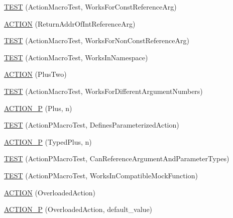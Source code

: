 \begin{DoxyCompactItemize}
\item 
\hyperlink{namespacetesting_1_1gmock__generated__actions__test_a8b4dadfc32c71e754d6ba3daae382715}{T\+E\+ST} (Action\+Macro\+Test, Works\+For\+Const\+Reference\+Arg)
\item 
\hyperlink{namespacetesting_1_1gmock__generated__actions__test_aeb01205293078272696bd0c19ce4e848}{A\+C\+T\+I\+ON} (Return\+Addr\+Of\+Int\+Reference\+Arg)
\item 
\hyperlink{namespacetesting_1_1gmock__generated__actions__test_a093a824ac7e8ec775a8f5d7b11d223a9}{T\+E\+ST} (Action\+Macro\+Test, Works\+For\+Non\+Const\+Reference\+Arg)
\item 
\hyperlink{namespacetesting_1_1gmock__generated__actions__test_af75a9a5b9d6a1cf718a58f030a5a9133}{T\+E\+ST} (Action\+Macro\+Test, Works\+In\+Namespace)
\item 
\hyperlink{namespacetesting_1_1gmock__generated__actions__test_a0eef2f885ccb1e4fac88a910f0fc5c2e}{A\+C\+T\+I\+ON} (Plus\+Two)
\item 
\hyperlink{namespacetesting_1_1gmock__generated__actions__test_acb98f6208678d9f5500a0c2c095b8cd0}{T\+E\+ST} (Action\+Macro\+Test, Works\+For\+Different\+Argument\+Numbers)
\item 
\hyperlink{namespacetesting_1_1gmock__generated__actions__test_ac081154b3ae2f099bd5be853cacfdaa4}{A\+C\+T\+I\+O\+N\+\_\+P} (Plus, n)
\item 
\hyperlink{namespacetesting_1_1gmock__generated__actions__test_a42a5fe606ca18b2eb1e5d7884045118f}{T\+E\+ST} (Action\+P\+Macro\+Test, Defines\+Parameterized\+Action)
\item 
\hyperlink{namespacetesting_1_1gmock__generated__actions__test_a3bcd440e11ab64ad5eb007efce33cf7d}{A\+C\+T\+I\+O\+N\+\_\+P} (Typed\+Plus, n)
\item 
\hyperlink{namespacetesting_1_1gmock__generated__actions__test_a4262c10efb367abf9771b3060c57d190}{T\+E\+ST} (Action\+P\+Macro\+Test, Can\+Reference\+Argument\+And\+Parameter\+Types)
\item 
\hyperlink{namespacetesting_1_1gmock__generated__actions__test_ab545244777c7559d1b0c2c63ee2be134}{T\+E\+ST} (Action\+P\+Macro\+Test, Works\+In\+Compatible\+Mock\+Function)
\item 
\hyperlink{namespacetesting_1_1gmock__generated__actions__test_a24927d97882dc1d52e203720df804188}{A\+C\+T\+I\+ON} (Overloaded\+Action)
\item 
\hyperlink{namespacetesting_1_1gmock__generated__actions__test_a1ee92e8b8bd6a5a54f5d2fcdb9f122b8}{A\+C\+T\+I\+O\+N\+\_\+P} (Overloaded\+Action, default\+\_\+value)

\end{DoxyCompactItemize}
